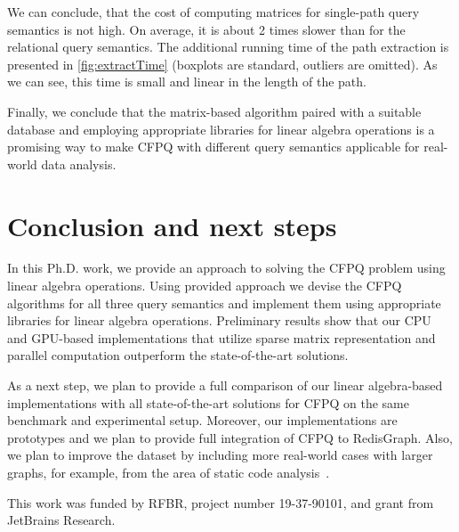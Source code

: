 \documentclass[sigconf, nonacm]{acmart}
\begin{document}
We can conclude, that the cost of computing matrices for single-path query semantics is not high. On average, it is about 2 times slower than for the relational query semantics. The additional running time of the path extraction is presented in \autoref{fig:extractTime} (boxplots are standard, outliers are omitted). As we can see, this time is small and linear in the length of the path.

Finally, we conclude that the matrix-based algorithm paired with a suitable database and employing appropriate libraries for linear algebra operations is a promising way to make CFPQ with different query semantics applicable for real-world data analysis.


\section{Conclusion and next steps}
In this Ph.D. work, we provide an approach to solving the CFPQ problem using linear algebra operations. Using provided approach we devise the CFPQ algorithms for all three query semantics and implement them using appropriate libraries for linear algebra operations. Preliminary results show that our CPU and GPU-based implementations that utilize sparse matrix representation and parallel computation outperform the state-of-the-art solutions.

As a next step, we plan to provide a full comparison of our linear algebra-based implementations with all state-of-the-art solutions for CFPQ on the same benchmark and experimental setup. Moreover, our implementations are prototypes and we
plan to provide full integration of CFPQ to RedisGraph. Also, we plan to improve the dataset by including more real-world cases with larger graphs, for example, from the area of static code analysis~\cite{Zheng, veduradabatch}.

\begin{acks}
	This work was funded by RFBR, project number
	19-37-90101, and grant from JetBrains Research.%
\end{acks}




\end{document}
